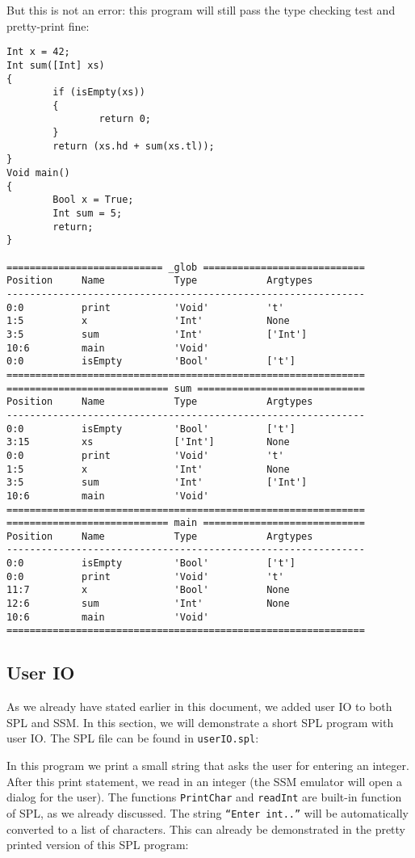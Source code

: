 \documentclass[a4paper]{article}
\begin{document}
But this is not an error: this program will still pass the type checking test and pretty-print fine: 
\begin{verbatim}
Int x = 42;
Int sum([Int] xs)
{
        if (isEmpty(xs))
        {
                return 0;
        }
        return (xs.hd + sum(xs.tl));
}
Void main()
{
        Bool x = True;
        Int sum = 5;
        return;
}

=========================== _glob ============================
Position     Name            Type            Argtypes            
--------------------------------------------------------------
0:0          print           'Void'          't'                 
1:5          x               'Int'           None                
3:5          sum             'Int'           ['Int']             
10:6         main            'Void'                              
0:0          isEmpty         'Bool'          ['t']               
==============================================================
============================ sum =============================
Position     Name            Type            Argtypes            
--------------------------------------------------------------
0:0          isEmpty         'Bool'          ['t']               
3:15         xs              ['Int']         None                
0:0          print           'Void'          't'                 
1:5          x               'Int'           None                
3:5          sum             'Int'           ['Int']             
10:6         main            'Void'                              
==============================================================
============================ main ============================
Position     Name            Type            Argtypes            
--------------------------------------------------------------
0:0          isEmpty         'Bool'          ['t']               
0:0          print           'Void'          't'                 
11:7         x               'Bool'          None                
12:6         sum             'Int'           None                
10:6         main            'Void'                              
==============================================================
\end{verbatim}

\subsection{User IO}
As we already have stated earlier in this document, we added user IO to both SPL and SSM. In this section, we will demonstrate a short SPL program with user IO. The SPL file can be found in {\tt userIO.spl}:

In this program we print a small string that asks the user for entering an integer. After this print statement, we read in an integer (the SSM emulator will open a dialog for the user). The functions {\tt PrintChar} and {\tt readInt} are built-in function of SPL, as we already discussed. The string {\tt ``Enter int..''} will be automatically converted to a list of characters. This can already be demonstrated in the pretty printed version of this SPL program: 
\end{document}
